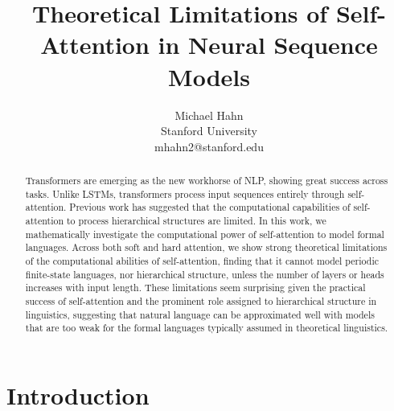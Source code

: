 \documentclass[11pt,a4paper]{article}
\title{Theoretical Limitations of Self-Attention in Neural Sequence Models}
\author{Michael Hahn \\ Stanford University \\ {\sf mhahn2@stanford.edu}}
\begin{document}
\maketitle
\begin{abstract}
Transformers are emerging as the new workhorse of NLP, showing great success across tasks.
Unlike LSTMs, transformers process input sequences entirely through self-attention.
Previous work has suggested that the computational capabilities of self-attention to process hierarchical structures are limited.
In this work, we mathematically investigate the computational power of self-attention to model formal languages.
Across both soft and hard attention, we show strong theoretical limitations of the computational abilities of self-attention, finding that it cannot model periodic finite-state languages, nor hierarchical structure, unless the number of layers or heads increases with input length.
These limitations seem surprising given the practical success of self-attention and the prominent role assigned to hierarchical structure in linguistics, suggesting that natural language can be approximated well with models that are too weak for the formal languages typically assumed in theoretical linguistics. %
\end{abstract}

\section{Introduction}
\end{document}
